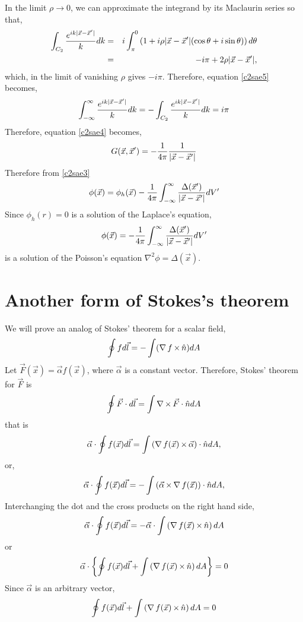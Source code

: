 In the limit $\rho \rightarrow 0$, we can approximate the integrand by its Maclaurin series so that,
\begin{eqnarray*}
\int_{C_2}\frac{e^{ik|\vec{x}-\vec{x}^\prime|}}{k} dk &=& i\int_{\pi}^0 \left(1 + i\rho|\vec{x}-\vec{x}^\prime|(\cos\theta+i\sin\theta)\right) d\theta \\
 &=& -i\pi + 2\rho|\vec{x}-\vec{x}^\prime|,
\end{eqnarray*}
which, in the limit of vanishing $\rho$ gives $-i\pi$. Therefore, equation \eqref{c2sae5} becomes,
\[
\int_{-\infty}^\infty \frac{e^{ik|\vec{x}-\vec{x}^\prime|}}{k} dk = -\int_{C_2}\frac{e^{ik|\vec{x}-\vec{x}^\prime|}}{k} dk = i\pi
\]
Therefore, equation \eqref{c2sae4} becomes,
\[
G(\vec{x}, \vec{x}^\prime) = -\frac{1}{4\pi}\frac{1}{|\vec{x}-\vec{x}^\prime|}
\]
Therefore from \eqref{c2sae3}
\[
\phi(\vec{x})=\phi_h(\vec{x}) - \frac{1}{4\pi}\int_{-\infty}^{\infty}\frac{\Delta(\vec{x}^\prime)}{|\vec{x}-\vec{x}^\prime|} dV^\prime
\]
Since $\phi_h(r) = 0$ is a solution of the Laplace's equation,
\[
\phi(\vec{x}) = - \frac{1}{4\pi}\int_{-\infty}^{\infty}\frac{\Delta(\vec{x}^\prime)}{|\vec{x}-\vec{x}^\prime|} dV^\prime
\]
is a solution of the Poisson's equation $\nabla^2\phi = \Delta(\vec{x})$.

\section{Another form of Stokes's theorem}\label{c2sa3} 
We will prove an analog of Stokes' theorem for a scalar field,
\begin{equation}\label{c2sae6}
\oint f d\vec{l} = -\int(\operatorname{\nabla}{f} \operatorname{\times} \hat{n})dA
\end{equation}
Let $\vec{F}(\vec{x}) = \vec{\alpha} f(\vec{x})$, where $\vec{\alpha}$ is a constant vector. Therefore, Stokes' theorem for $\vec{F}$ is
\[
\oint\vec{F}\cdot d\vec{l} = \int\operatorname{\nabla\operatorname{\times}}{\vec{F}}\cdot\hat{n} dA
\]
that is
\[
\vec{\alpha}\cdot\oint f(\vec{x}) d\vec{l} = \int \left(\operatorname{\nabla}{f(\vec{x})} \operatorname{\times} \vec{\alpha}\right)\cdot\hat{n} dA,
\]
or,
\[
\vec{\alpha}\cdot\oint f(\vec{x}) d\vec{l} = -\int \left(\vec{\alpha} \operatorname{\times} \operatorname{\nabla}{f(\vec{x})}\right)\cdot\hat{n} dA,
\]
Interchanging the dot and the cross products on the right hand side,
\[
\vec{\alpha}\cdot\oint f(\vec{x}) d\vec{l} = -\vec{\alpha}\cdot\int\left(\operatorname{\nabla}{f(\vec{x})} \operatorname{\times} \hat{n}\right)dA
\]
or
\[
\vec{\alpha}\cdot\left\{\oint f(\vec{x}) d\vec{l} + \int\left(\operatorname{\nabla}{f(\vec{x})} \operatorname{\times} \hat{n}\right)dA\right\} = 0
\]
Since $\vec{\alpha}$ is an arbitrary vector,
\[
\oint f(\vec{x}) d\vec{l} + \int\left(\operatorname{\nabla}{f(\vec{x})} \operatorname{\times} \hat{n}\right)dA = 0
\]

